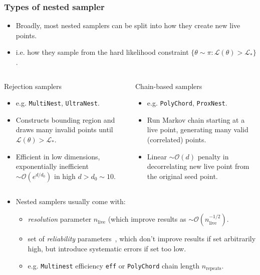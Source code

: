 \documentclass[aspectratio=169]{beamer}
\begin{document}
\begin{frame}
    \frametitle{Types of nested sampler}
    \begin{itemize}
        \item Broadly, most nested samplers can be split into how they create new live points.
        \item i.e. how they sample from the hard likelihood constraint $\{\theta\sim \pi : \mathcal{L}(\theta)>\mathcal{L}_* \}$.
    \end{itemize}
    \vspace{-10pt}
    \begin{columns}[t]
        \begin{block}{Rejection samplers}
            \begin{itemize}
                \item e.g. \texttt{MultiNest}, \texttt{UltraNest}.
\item Constructs bounding region and draws many invalid points until $\mathcal{L}(\theta)>\mathcal{L}_*$.
                \item Efficient in low dimensions, exponentially inefficient $\sim\mathcal{O}(e^{d/d_0})$ in high  $d>d_0\sim10$.
            \end{itemize}
        \end{block}
        \begin{block}{Chain-based samplers}
            \begin{itemize}
                \item e.g. \texttt{PolyChord}, \texttt{ProxNest}.
                \item Run Markov chain starting at a live point, generating many valid (correlated) points.
                \item Linear $\sim\mathcal{O}(d)$ penalty in decorrelating new live point from the original seed point.
            \end{itemize}
        \end{block}
    \end{columns}
    \vspace{5pt}
    \begin{itemize}
        \item Nested samplers usually come with:
            \begin{itemize}
                \item \emph{resolution} parameter $n_\text{live}$ (which improve results as $\sim\mathcal{O}(n_\text{live}^{-1/2})$.
                    \item set of \emph{reliability} parameters~, which don't improve results if set arbitrarily high, but introduce systematic errors if set too low.
                    \item e.g. \texttt{Multinest} efficiency \texttt{eff} or \texttt{PolyChord} chain length $n_\text{repeats}$.
            \end{itemize}
    \end{itemize}
\end{frame}
\end{document}

